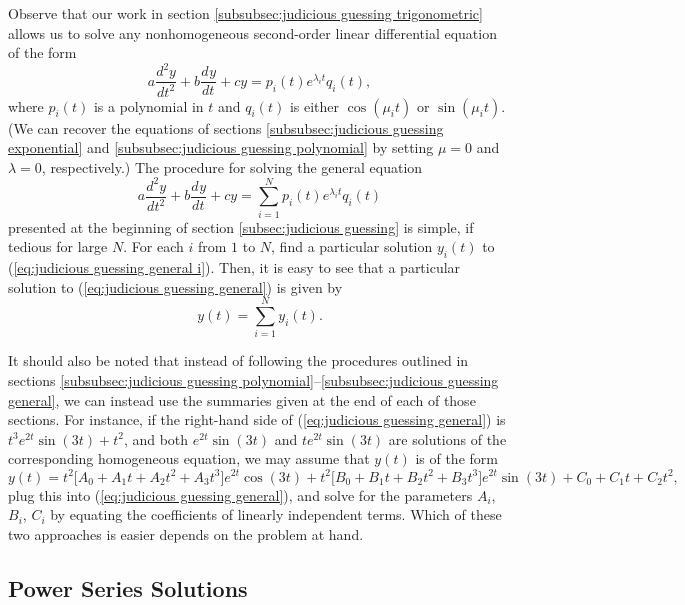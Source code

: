\documentclass{myart}
\newcommand{\eq}[1]{(\ref{eq:#1})}
\newcommand{\deriv}[3][]{\frac{d^{#1}#2}{d#3^{#1}}}
\begin{document}
Observe that our work in section \ref{subsubsec:judicious guessing
  trigonometric} allows us to solve any nonhomogeneous second-order
linear differential equation of the form
\begin{equation} \label{eq:judicious guessing general i}
    a \deriv[2]{y}{t} + b \deriv{y}{t} + cy
  = p_i(t)e^{\lambda_i t}q_i(t),
\end{equation}
where $p_i(t)$ is a polynomial in $t$ and $q_i(t)$ is either
$\cos(\mu_i t)$ or $\sin(\mu_i t)$. (We can recover the equations of
sections \ref{subsubsec:judicious guessing exponential} and
\ref{subsubsec:judicious guessing polynomial} by setting $\mu = 0$ and
$\lambda = 0$, respectively.) The procedure for solving the general
equation
\begin{equation} \label{eq:judicious guessing general}
    a \deriv[2]{y}{t} + b \deriv{y}{t} + cy
  = \sum_{i=1}^N p_i(t)e^{\lambda_i t}q_i(t)
\end{equation}
presented at the beginning of section \ref{subsec:judicious guessing}
is simple, if tedious for large $N$. For each $i$ from $1$ to $N$,
find a particular solution $y_i(t)$ to \eq{judicious guessing general
  i}. Then, it is easy to see that a particular solution to
\eq{judicious guessing general} is given by
\begin{equation*}
  y(t) = \sum_{i=1}^N y_i(t).
\end{equation*}

It should also be noted that instead of following the procedures
outlined in sections \ref{subsubsec:judicious guessing
  polynomial}--\ref{subsubsec:judicious guessing general}, we can
instead use the summaries given at the end of each of those sections.
For instance, if the right-hand side of \eq{judicious guessing
  general} is $t^3 e^{2t} \sin(3t) + t^2$, and both $e^{2t} \sin(3t)$
and $te^{2t} \sin(3t)$ are solutions of the corresponding homogeneous
equation, we may assume that $y(t)$ is of the form
\begin{equation*}
  y(t) = t^2\Big[A_0 + A_1t + A_2t^2 + A_3t^3\Big] e^{2t} \cos(3t)
       + t^2\Big[B_0 + B_1t + B_2t^2 + B_3t^3\Big] e^{2t} \sin(3t)
       + C_0 + C_1t + C_2t^2,
\end{equation*}
plug this into \eq{judicious guessing general}, and solve for the
parameters $A_i$, $B_i$, $C_i$ by equating the coefficients of
linearly independent terms. Which of these two approaches is easier
depends on the problem at hand.

\subsection{Power Series Solutions}
\label{subsec:power series}
\end{document}

